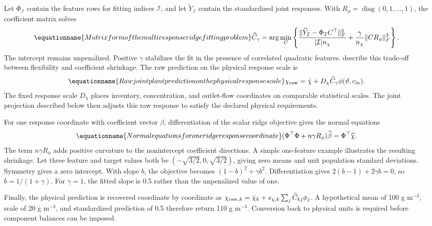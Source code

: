Let $\Phi_{\mathcal I}$ contain the feature rows for fitting indices $\mathcal I$, and let $\widetilde Y_{\mathcal I}$ contain the standardized joint responses. With $R_\phi=\operatorname{diag}(0,1,\ldots,1)$, the coefficient matrix solves
\begin{equation}
\equationname{Matrix form of the multiresponse ridge fitting problem}
\widehat C_\gamma=\arg\min_C
\left\{\frac{\|\widetilde Y_{\mathcal I}-\Phi_{\mathcal I}C^\top\|_F^2}
{|\mathcal I|n_\chi}+\frac{\gamma}{n_\chi}\|CR_\phi\|_F^2\right\}.
\label{eq:plant_ridge_fit}
\end{equation}
The intercept remains unpenalized. Positive $\gamma$ stabilizes the fit in the presence of correlated quadratic features. \citet{Hastie2009} describe this trade-off between flexibility and coefficient shrinkage. The raw prediction on the physical response scale is
\begin{equation}
\equationname{Raw joint plant prediction on the physical response scale}
\chi_{\rm raw}=\bar\chi+D_\chi\widehat C_\gamma\phi(\vartheta,c_{\rm in}).
\label{eq:plant_raw_prediction}
\end{equation}
The fixed response scale $D_\chi$ places inventory, concentration, and outlet-flow coordinates on comparable statistical scales. The joint projection described below then adjusts this raw response to satisfy the declared physical requirements.

For one response coordinate with coefficient vector $\beta$, differentiation of the scalar ridge objective gives the normal equations
\begin{equation}
\equationname{Normal equations for one ridge response coordinate}
(\Phi^\top\Phi+n\gamma R_\phi)\widehat\beta=\Phi^\top\widetilde\chi.
\end{equation}
The term $n\gamma R_\phi$ adds positive curvature to the nonintercept coefficient directions. A simple one-feature example illustrates the resulting shrinkage. Let three feature and target values both be $(-\sqrt{3/2},0,\sqrt{3/2})$, giving zero means and unit population standard deviations. Symmetry gives a zero intercept. With slope $b$, the objective becomes $(1-b)^2+\gamma b^2$. Differentiation gives $2(b-1)+2\gamma b=0$, so $\widehat b=1/(1+\gamma)$. For $\gamma=1$, the fitted slope is 0.5 rather than the unpenalized value of one.

Finally, the physical prediction is recovered coordinate by coordinate as $\chi_{{\rm raw},k}=\bar\chi_k+s_{\chi,k}\sum_j\widehat C_{kj}\phi_j$. A hypothetical mean of 100 g m$^{-3}$, scale of 20 g m$^{-3}$, and standardized prediction of 0.5 therefore return 110 g m$^{-3}$. Conversion back to physical units is required before component balances can be imposed.

